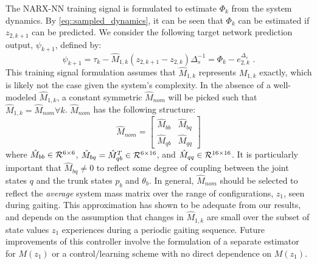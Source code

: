 			The  NARX-NN training signal is formulated to estimate $\Phi_{k}$ from the system dynamics. By \ref{eq::sampled_dynamics}, it can be seen that $\Phi_{k}$ can be estimated if ${z}_{2,k+1}$ can be predicted. We consider the following target network prediction output, $\psi_{k+1}$,  defined by:
				\begin{equation}
					\psi_{k+1} = \tau_{k} - \hat{M}_{1,k}({z}_{2,k+1} - {z}_{2,k})\Delta_{s}^{-1} = \Phi_{k} - {e}_{2,k}^{\Delta_{s}} \text{ .}
					\label{eq::training_signal}
				\end{equation}
			This training signal formulation assumes that $\hat{M}_{1,k}$ represents $M_{1,k}$ exactly, which is likely not the case given the system's complexity. In the absence of a well-modeled $\hat{M}_{1,k}$, a constant symmetric $\hat{M}_{nom}$ will be picked such that $\hat{M}_{1,k} = \hat{M}_{nom} \forall k$. $\hat{M}_{nom}$ has the following structure:
				\begin{equation}
					\hat{M}_{nom} = \left[
						\begin{array}{cc}
						\hat{M}_{bb}	&	 \hat{M}_{bq}\\
						\hat{M}_{qb}	&	 \hat{M}_{qq}
						\end{array}
					\right]
				\end{equation}
			where 	$\hat{M}_{bb}\in {\cal R}^{6\times6}$, 
					$\hat{M}_{bq}=\hat{M}_{qb}^{T} \in {\cal R}^{6\times16}$, and  
					$\hat{M}_{qq}\in {\cal R}^{16\times16}$. 
			It is particularly important that $\hat{M}_{bq}\neq0$ to reflect some degree of coupling between the joint states $q$ and the trunk states ${p}_{b}$ and $\theta_{b}$. In general, $\hat{M}_{nom}$ should be selected to reflect the \emph{average} system mass matrix over the range of configurations, $z_{1}$, seen during gaiting. This approximation has shown to be adequate from our results, and depends on the assumption that changes in $\hat{M}_{1,k}$ are small  over the subset of state values $z_{1}$ experiences during a periodic gaiting sequence. Future improvements of this controller involve the formulation of a separate estimator for $M(z_{1})$ or a control/learning scheme with no direct dependence on $M(z_{1})$.

